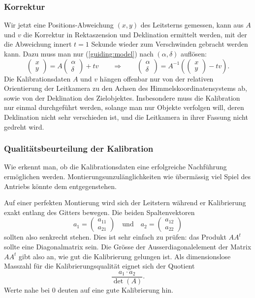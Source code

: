 \subsubsection{Korrektur}
Wir jetzt eine Positions-Abweichung $(x,y)$ des Leitsterns gemessen,
kann aus $A$ und $v$ die Korrektur in Rektaszension und Deklination
ermittelt werden, mit der die Abweichung innert $t=1$ Sekunde wieder
zum Verschwinden gebracht werden kann. Dazu muss man nur
(\ref{guiding:model}) nach $(\alpha,\delta)$ auflösen:
\[
\begin{pmatrix}x\\y\end{pmatrix}
=
A\begin{pmatrix}\alpha\\\delta\end{pmatrix}+tv
\qquad
\Rightarrow
\qquad
\begin{pmatrix}\alpha\\\delta\end{pmatrix}=
A^{-1}\left(
\begin{pmatrix}
x\\y
\end{pmatrix}
-tv
\right).
\]
Die Kalibrationsdaten $A$ und $v$ hängen offenbar nur von der relativen
Orientierung der Leitkamera zu den Achsen des Himmelskoordinatensystems
ab, sowie von der Deklination des Zielobjektes.
Insbesondere muss die
Kalibration nur einmal durchgeführt werden, solange man nur Objekte verfolgen
will, deren Deklination nicht sehr verschieden ist, und die Leitkamera in ihrer
Fassung nicht gedreht wird.

\subsubsection{Qualitätsbeurteilung der Kalibration}
Wie erkennt man, ob die Kalibrationsdaten eine erfolgreiche Nachführung
ermöglichen werden. Montierungsunzulänglichkeiten wie übermässig 
viel Spiel des Antriebs könnte dem entgegenstehen.

Auf einer perfekten Montierung wird sich der Leitstern während er 
Kalibrierung exakt entlang des Gitters bewegen. Die beiden Spaltenvektoren
\[
a_1=\begin{pmatrix}a_{11}\\ a_{21}\end{pmatrix}
\quad\text{und}
\quad
a_2=\begin{pmatrix}a_{12}\\ a_{22}\end{pmatrix}
\]
sollten also senkrecht stehen. Dies ist sehr einfach zu prüfen:
das Produkt $AA^t$ sollte eine Diagonalmatrix sein. Die Grösse der
Ausserdiagonalelement der Matrix $AA^t$ gibt also an, wie gut die Kalibrierung
gelungen ist.
Als dimensionslose  Masszahl für die Kalibrierungsqualität
eignet sich der Quotient
\[
\frac{a_1\cdot a_2}{\det(A)}.
\]
Werte nahe bei $0$ deuten auf eine gute Kalibrierung hin.
